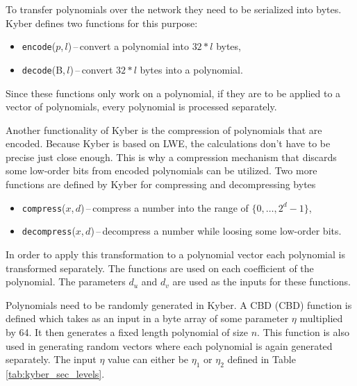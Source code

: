 To transfer polynomials over the network they need to be serialized into bytes. Kyber defines two functions for this purpose:
\begin{itemize}
  \item \texttt{encode}($p$,\,$l$)\,--\,convert a polynomial into $32*l$ bytes,
  \item \texttt{decode}(B,\,$l$)\,--\,convert $32*l$ bytes into a polynomial.
\end{itemize}
Since these functions only work on a polynomial, if they are to be applied to a vector of polynomials, every polynomial is processed separately.

Another functionality of Kyber is the compression of polynomials that are encoded. Because Kyber is based on LWE, the calculations don't have to be precise just close enough. This is why a compression mechanism that discards some low-order bits from encoded polynomials can be utilized. Two more functions are defined by Kyber for compressing and decompressing bytes
\begin{itemize}
  \item \texttt{compress}($x$,\,$d$)\,--\,compress a number into the range of $\{0,\dots,2^d-1\}$,
  \item \texttt{decompress}($x$,\,$d$)\,--\,decompress a number while loosing some low-order bits.
\end{itemize}
In order to apply this transformation to a polynomial vector each polynomial is transformed separately. The functions are used on each coefficient of the polynomial. The parameters $d_u$ and $d_v$ are used as the inputs for these functions.

Polynomials need to be randomly generated in Kyber. A CBD (\acl{CBD}) function is defined which takes as an input in a byte array of some parameter $\eta$ multiplied by 64. It then generates a fixed length polynomial of size $n$. This function is also used in generating random vectors where each polynomial is again generated separately. The input $\eta$ value can either be $\eta_1$ or $\eta_2$ defined in Table \ref{tab:kyber_sec_levels}.
